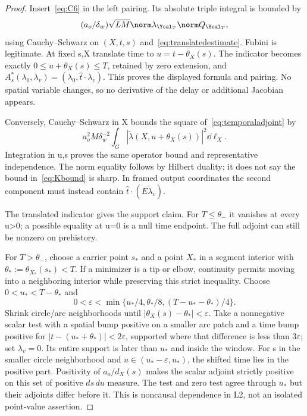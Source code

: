 \begin{proof}
Insert~\eqref{eq:C6} in the left pairing. Its absolute triple integral is bounded by
\[
(a_o/\delta_w)\sqrt{LM}\norm\lambda_{\Ycal_T}\norm Q_{\Hcal_T},
\]
using Cauchy--Schwarz on $(X,t,s)$ and~\eqref{eq:translatedestimate}. Fubini is legitimate. At fixed s,X translate time to $u=t-\theta_X(s)$. The indicator becomes exactly $0\le u+\theta_X(s)\le T$, retained by zero extension, and $A_s^*(\lambda_0,\lambda_v)=(\lambda_0,\hat t\cdot\lambda_v)$. This proves the displayed formula and pairing. No spatial variable changes, so no derivative of the delay or additional Jacobian appears.

Conversely, Cauchy--Schwarz in X bounds the square of~\eqref{eq:temporaladjoint} by
\[
a_o^2M\delta_w^{-2}\int_G|\widetilde\lambda(X,u+\theta_X(s))|^2\dd\ell_X.
\]
Integration in u,s proves the same operator bound and representative independence. The norm equality follows by Hilbert duality; it does not say the bound in~\eqref{eq:Kbound} is sharp. In framed output coordinates the second component must instead contain $\hat t\cdot(E\widetilde\lambda_v)$.

The translated indicator gives the support claim. For $T\le\theta_-$ it vanishes at every u>0; a possible equality at u=0 is a null time endpoint. The full adjoint can still be nonzero on prehistory.

For $T>\theta_-$, choose a carrier point $s_*$ and a point $X_*$ in a segment interior with $\theta_*:=\theta_{X_*}(s_*)<T$. If a minimizer is a tip or elbow, continuity permits moving into a neighboring interior while preserving this strict inequality. Choose $0<u_*<T-\theta_*$ and
\begin{equation}\label{eq:futureepsilon}
0<\varepsilon<\min\{u_*/4,\theta_*/8,(T-u_*-\theta_*)/4\}.
\end{equation}
Shrink circle/arc neighborhoods until $|\theta_X(s)-\theta_*|<\varepsilon$. Take a nonnegative scalar test with a spatial bump positive on a smaller arc patch and a time bump positive for
$|t-(u_*+\theta_*)|<2\varepsilon$, supported where that difference is less than $3\varepsilon$; set $\lambda_v=0$. Its entire support is later than $u_*$ and inside the window. For s in the smaller circle neighborhood and $u\in(u_*-\varepsilon,u_*)$, the shifted time lies in the positive part. Positivity of $a_o/d_X(s)$ makes the scalar adjoint strictly positive on this set of positive $ds\,du$ measure. The test and zero test agree through $u_*$ but their adjoints differ before it. This is noncausal dependence in L2, not an isolated point-value assertion.
\end{proof}

